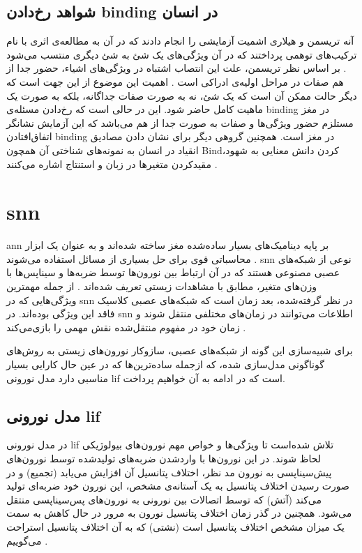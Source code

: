 \documentclass[12pt]{report}
\begin{document}
	
	\subsection{شواهد رخ‌دادن \gls{binding} در انسان}
	\label{subsection:binding-in-human}
	
	
	آنه تریسمن
	و هیلاری اشمیت
	آزمایشی را انجام دادند که در آن به مطالعه‌ی اثری با نام ترکیب‌های توهمی
	پرداختند که در آن ویژگی‌های یک شئ به شئ دیگری منتسب می‌شود
	\cite{TREISMAN1982107}.
	بر اساس نظر تریسمن، علت این انتصاب اشتباه در ویژگی‌های اشیاء، حضور جدا از هم صفات در مراحل اولیه‌ی ادراکی است
	\cite{goldstein_2019}.
	اهمیت این موضوع از این جهت است که دیگر حالت ممکن آن است که یک شئ، نه به صورت صفات جداگانه، بلکه به صورت یک ماهیت کامل حاضر شود. این در حالی است که رخ‌دادن مسئله‌ی \gls{binding} در مغز مستلزم حضور ویژگی‌ها و صفات به صورت جدا از هم می‌باشد که این آزمایش نشانگر اتفاق‌افتادن \gls{binding} در مغز است. همچنین گروهی دیگر برای نشان دادن مصادیق انقیاد در انسان به نمونه‌های شناختی آن همچون \gls{Bind}‌کردن دانش معنایی به شهود، مقیدکردن متغیر‌ها در زبان و استنتاج اشاره می‌کنند \cite{greff2020binding}.
	
	
	\section{\gls{snn}}
	\gls{ann} بر پایه دینامیک‌های بسیار ساده‌شده مغز ساخته شده‌اند و به عنوان یک ابزار محاسباتی قوی برای حل بسیاری از مسائل استفاده می‌شوند
	\cite{TGNN}. 
	\gls{snn} نوعی از شبکه‌های عصبی مصنوعی هستند که در آن ارتباط بین نورون‌ها توسط ضربه‌ها و سیناپس‌ها  با وزن‌های متغیر، مطابق با مشاهدات زیستی تعریف شده‌اند
	\cite{ghosh2009spiking}. 
	از جمله مهمترین ویژگی‌هایی که در \gls{snn} در نظر گرفته‌شده، بعد زمان است
	\cite{Mozafari2019}
	که شبکه‌های عصبی کلاسیک فاقد این ویژگی بوده‌اند. در \gls{snn} اطلاعات می‌توانند در زمان‌های مختلفی منتقل شوند و زمان خود در مفهوم منتقل‌شده نقش مهمی را بازی‌می‌کند
	\cite{SNN1997}.
	
	برای شبیه‌سازی این گونه از شبکه‌های عصبی، سازوکار نورون‌های زیستی به روش‌‌های گوناگونی مدل‌سازی شده‌، که ازجمله ساده‌ترین‌ها که در عین‌ حال کارایی بسیار مناسبی دارد مدل نورونی \gls{lif} است که در ادامه به آن خواهیم پرداخت.
	
	
	\subsection{مدل نورونی \gls{lif}}
	در مدل نورونی \gls{lif} تلاش شده‌است تا ویژگی‌ها و خواص مهم نورون‌های بیولوژیکی لحاظ شوند. در این نورون‌ها با وارد‌شدن ضربه‌های تولیدشده توسط نورون‌های پیش‌سیناپسی به نورون مد ‌نظر، اختلاف پتانسیل آن افزایش می‌یابد (تجمیع) و در صورت رسیدن اختلاف پتانسیل به یک آستانه‌ی مشخص، این نورون خود ضربه‌ای تولید می‌کند (آتش) که توسط اتصالات بین نورونی به نورون‌های پس‌سیناپسی منتقل می‌شود. همچنین در گذر زمان اختلاف پتانسیل نورون به مرور در حال کاهش به سمت یک میزان مشخص اختلاف پتانسیل است (نشتی) که به آن اختلاف پتانسیل استراحت می‌گوییم
	\cite{gerstner2014neuronal}.
	
\end{document}
